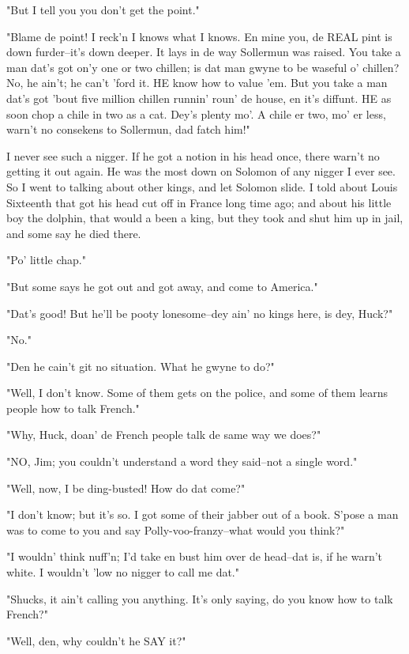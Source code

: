 "But I tell you you don't get the point."

"Blame de point!  I reck'n I knows what I knows.  En mine you, de REAL
pint is down furder--it's down deeper.  It lays in de way Sollermun was
raised.  You take a man dat's got on'y one or two chillen; is dat man
gwyne to be waseful o' chillen?  No, he ain't; he can't 'ford it.  HE
know how to value 'em.  But you take a man dat's got 'bout five million
chillen runnin' roun' de house, en it's diffunt.  HE as soon chop a chile
in two as a cat. Dey's plenty mo'.  A chile er two, mo' er less, warn't
no consekens to Sollermun, dad fatch him!"

I never see such a nigger.  If he got a notion in his head once, there
warn't no getting it out again.  He was the most down on Solomon of any
nigger I ever see.  So I went to talking about other kings, and let
Solomon slide.  I told about Louis Sixteenth that got his head cut off in
France long time ago; and about his little boy the dolphin, that would a
been a king, but they took and shut him up in jail, and some say he died
there.

"Po' little chap."

"But some says he got out and got away, and come to America."

"Dat's good!  But he'll be pooty lonesome--dey ain' no kings here, is
dey, Huck?"

"No."

"Den he cain't git no situation.  What he gwyne to do?"

"Well, I don't know.  Some of them gets on the police, and some of them
learns people how to talk French."

"Why, Huck, doan' de French people talk de same way we does?"

"NO, Jim; you couldn't understand a word they said--not a single word."

"Well, now, I be ding-busted!  How do dat come?"

"I don't know; but it's so.  I got some of their jabber out of a book.
S'pose a man was to come to you and say Polly-voo-franzy--what would you
think?"

"I wouldn' think nuff'n; I'd take en bust him over de head--dat is, if he
warn't white.  I wouldn't 'low no nigger to call me dat."

"Shucks, it ain't calling you anything.  It's only saying, do you know
how to talk French?"

"Well, den, why couldn't he SAY it?"

